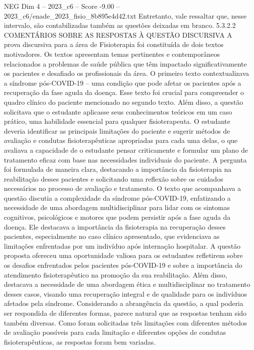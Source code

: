 \begin{textsample}{NEG Dim 4 – 2023\_c6 – Score -9.00 – 2023\_c6/enade\_2023\_fisio\_8b895e4d42.txt}
Entretanto, vale ressaltar que, nesse intervalo, são contabilizadas também as questões deixadas em branco. 5.3.2.2 COMENTÁRIOS SOBRE AS RESPOSTAS À QUESTÃO DISCURSIVA A prova discursiva para a área de Fisioterapia foi constituída de dois textos motivadores.
Os textos apresentam temas pertinentes e contemporâneos relacionados a problemas de saúde pública que têm impactado significativamente os pacientes e desafiado os profissionais da área.
O primeiro texto contextualizava a síndrome pós-COVID-19 – uma condição que pode afetar os pacientes após a recuperação da fase aguda da doença.
Esse texto foi crucial para compreender o quadro clínico do paciente mencionado no segundo texto.
Além disso, a questão solicitava que o estudante aplicasse seus conhecimentos teóricos em um caso prático, uma habilidade essencial para qualquer fisioterapeuta.
O estudante deveria identificar as principais limitações do paciente e sugerir métodos de avaliação e condutas fisioterapêuticas apropriadas para cada uma delas, o que avaliava a capacidade de o estudante pensar criticamente e formular um plano de tratamento eficaz com base nas necessidades individuais do paciente.
A pergunta foi formulada de maneira clara, destacando a importância da fisioterapia na reabilitação desses pacientes e solicitando uma reflexão sobre os cuidados necessários no processo de avaliação e tratamento.
O texto que acompanhava a questão discutia a complexidade da síndrome pós-COVID-19, enfatizando a necessidade de uma abordagem multidisciplinar para lidar com os sintomas cognitivos, psicológicos e motores que podem persistir após a fase aguda da doença.
Ele destacava a importância da fisioterapia na recuperação desses pacientes, especialmente no caso clínico apresentado, que evidenciava as limitações enfrentadas por um indivíduo após internação hospitalar.
A questão proposta ofereceu uma oportunidade valiosa para os estudantes refletirem sobre os desafios enfrentados pelos pacientes pós-COVID-19 e sobre a importância do atendimento fisioterapêutico na promoção da sua reabilitação.
Além disso, destacava a necessidade de uma abordagem ética e multidisciplinar no tratamento desses casos, visando uma recuperação integral e de qualidade para os indivíduos afetados pela síndrome.
Considerando a abrangência da questão, a qual poderia ser respondida de diferentes formas, parece natural que as respostas tenham sido também diversas.
Como foram solicitadas três limitações com diferentes métodos de avaliação possíveis para cada limitação e diferentes opções de condutas fisioterapêuticas, as respostas foram bem variadas.

\end{textsample}
